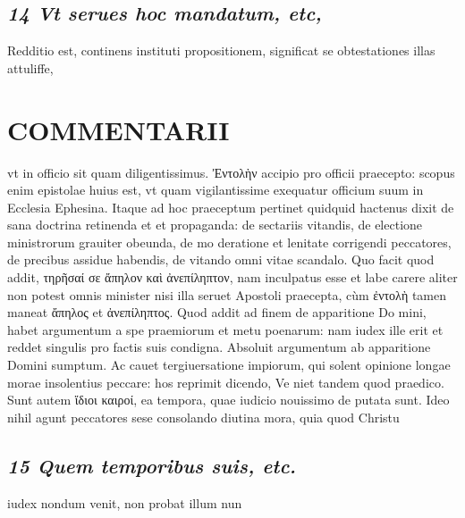 \documentclass{article}
\begin{document}
\begin{pages}
\subsection*{\textit{14 Vt serues hoc mandatum, etc, }}\pstart Redditio est, continens instituti propositionem, significat se obtestationes illas attuliffe,  \pend
\section*{COMMENTARII }
\marginpar{[ p.164 ]}\pstart vt in officio sit quam diligentissimus. Ἐντολὴν accipio pro officii praecepto: scopus enim epistolae huius est, vt quam vigilantissime exequatur officium suum in Ecclesia Ephesina. Itaque ad hoc praeceptum pertinet quidquid hactenus dixit de sana doctrina retinenda et et propaganda: de sectariis vitandis, de electione ministrorum grauiter obeunda, de mo deratione et lenitate corrigendi peccatores, de precibus assidue habendis, de vitando omni vitae scandalo. Quo facit quod addit, τηρῆσαί σε ἄπηλον καὶ ἀνεπίληπτον, nam inculpatus esse et labe carere aliter non potest omnis minister nisi illa seruet Apostoli praecepta, cùm ἐντολὴ tamen maneat ἄπηλος et ἀνεπίληπτος. Quod addit ad finem de apparitione Do mini, habet argumentum a spe praemiorum et metu poenarum: nam iudex ille erit et reddet singulis pro factis suis condigna. Absoluit argumentum ab apparitione Domini sumptum. Ac cauet tergiuersatione impiorum, qui solent opinione longae morae insolentius peccare: hos reprimit dicendo, Ve niet tandem quod praedico. Sunt autem ἵδιοι καιροί, ea tempora, quae iudicio nouissimo de putata sunt. Ideo nihil agunt peccatores sese consolando diutina mora, quia quod Christu  \pend
{}
{}
\subsection*{\textit{15 Quem temporibus suis, etc. }}\pstart iudex nondum venit, non probat illum nun\pend

\end{pages}
\end{document}
